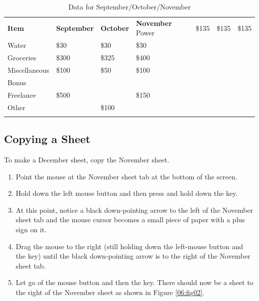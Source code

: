 \begin{table}[H]
	{\small
		\begin{longtable}{L{1.0in}L{0.75in}L{0.75in}L{0.75in}} %
			\textbf{Item} & \textbf{September} & \textbf{October} & \textbf{November} \endhead
			\hline
			Power         & \$135 & \$135 & \$135\\
			Water         & \$30  & \$30  & \$30 \\
			Groceries     & \$300 & \$325 & \$400\\
			Miscellaneous & \$100 & \$50  & \$100\\
			Bonus         &       &       &      \\
			Freelance     & \$500 &       & \$150\\
			Other         &       & \$100 &      \\

			\caption{Data for September/October/November}
			\label{06:tab01}
		\end{longtable}
	}
\end{table}

\subsection{Copying a Sheet}

To make a December sheet, copy the November sheet.

\begin{enumerate}
	\item Point the mouse at the November sheet tab at the bottom of the screen.
	\item Hold down the left mouse button and then press and hold down the  key.
	\item At this point, notice a black down-pointing arrow to the left of the November sheet tab and the mouse cursor becomes a small piece of paper with a plus sign on it.
	\item Drag the mouse to the right (still holding down the left-mouse button and the  key) until the black down-pointing arrow is to the right of the November sheet tab.
	\item Let go of the mouse button and then the  key. There should now be a  sheet to the right of the November sheet as shown in Figure \ref{06:fig02}.
\end{enumerate}

